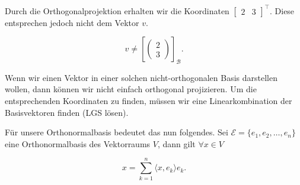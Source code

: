 \begin{figure*}[h!]
\end{figure*}

Durch die Orthogonalprojektion erhalten wir die Koordinaten \( \begin{bmatrix} 2 & 3 \end{bmatrix}^\intercal \). Diese entsprechen jedoch nicht dem Vektor \( v \). 

\begin{equation*}
    v \neq \left[ \begin{pmatrix} 2 \\ 3 \end{pmatrix} \right]_\mathcal{B}.
\end{equation*}

\vspace{0.25\baselineskip}

Wenn wir einen Vektor in einer solchen nicht-orthogonalen Basis darstellen wollen, dann können wir nicht einfach orthogonal projizieren. Um die entsprechenden Koordinaten zu finden, müssen wir eine Linearkombination der Basisvektoren finden (LGS lösen). 

\vspace{1\baselineskip}

Für unsere Orthonormalbasis bedeutet das nun folgendes. Sei \( \mathcal{E} = \{ e_1, e_2, \ldots, e_n \} \) eine Orthonormalbasis des Vektorraums \( V \), dann gilt \( \forall x \in V \)

\begin{equation*}
    x = \sum_{k=1}^n \langle x, e_k \rangle e_k.
\end{equation*}

\vspace{0.25\baselineskip}

